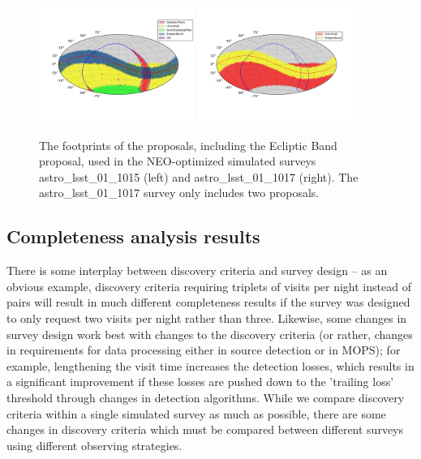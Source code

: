 \begin{figure}
\centering
\includegraphics[width=0.45\textwidth]{figures/astro_lsst_01_1015_proposal_footprint}
\includegraphics[width=0.45\textwidth]{figures/astro_lsst_01_1017_proposal_footprint}
\caption{The footprints of the proposals, including the Ecliptic Band proposal, used in the NEO-optimized simulated surveys astro\_lsst\_01\_1015 (left) and astro\_lsst\_01\_1017 (right). The astro\_lsst\_01\_1017 survey only includes two proposals.
\label{fig:neo_footprints}}
\end{figure}

\subsection{Completeness analysis results}

There is some interplay between discovery criteria and survey design -- as an obvious example, discovery criteria requiring triplets of visits per night instead of pairs will result in much different completeness results if the survey was designed to only request two visits per night rather than three. Likewise, some changes in survey design work best with changes to the discovery criteria (or rather, changes in requirements for data processing either in source detection or in MOPS); for example, lengthening the visit time increases the detection losses, which results in a significant improvement if these losses are pushed down to the 'trailing loss' threshold through changes in detection algorithms.  While we compare discovery criteria within a single simulated survey as much as possible, there are some changes in discovery criteria which must be compared between different surveys using different observing strategies.  

